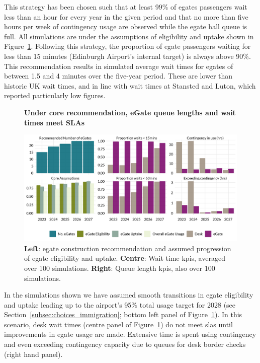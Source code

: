 \documentclass[10pt]{article}
\newcommand*{\figuretitle}[1]{%
    {\centering%
    \textbf{#1}%
    \par\medskip}%
}
\begin{document}
This strategy has been chosen such that at least 99\% of \glspl{egate} passengers wait less than an hour for every year in the given period and that no more than five hours per week of contingency usage are observed while the \gls{egate} hall queue is full. All simulations are under the assumptions of eligibility and uptake shown in Figure~\ref{fig:core_rec_fig}. Following this strategy, the proportion of \gls{egate} passengers waiting for less than 15 minutes (Edinburgh Airport's internal target) is always above 90\%. This recommendation results in simulated average wait times for \glspl{egate} of between 1.5 and 4 minutes over the five-year period. These are lower than historic UK wait times, and in line with wait times at Stansted and Luton, which reported particularly low figures. 

\begin{figure}[!ht]
    \centering
    \figuretitle{Under core recommendation, eGate queue lengths and wait times meet SLAs}
    \includegraphics[width=\textwidth]{figures/core_rec_fig.png}
     \caption{\textbf{Left}: \gls{egate} construction recommendation and assumed progression of \gls{egate} eligibility and uptake. \textbf{Centre}: Wait time \glspl{kpi}, averaged over 100 simulations. \textbf{Right}: Queue length \glspl{kpi}, also over 100 simulations.} \label{fig:core_rec_fig}
\end{figure}

In the simulations shown we have assumed smooth transitions in \gls{egate} eligibility and uptake leading up to the airport's 95\% total usage target for 2028 (see Section~\ref{subsec:choices_immigration}; bottom left panel of Figure~\ref{fig:core_rec_fig}). In this scenario, desk wait times (centre panel of Figure~\ref{fig:core_rec_fig}) do not meet \glspl{sla} until improvements in \gls{egate} usage are made. Extensive time is spent using contingency and even exceeding contingency capacity due to queues for desk border checks (right hand panel). 
\end{document}
